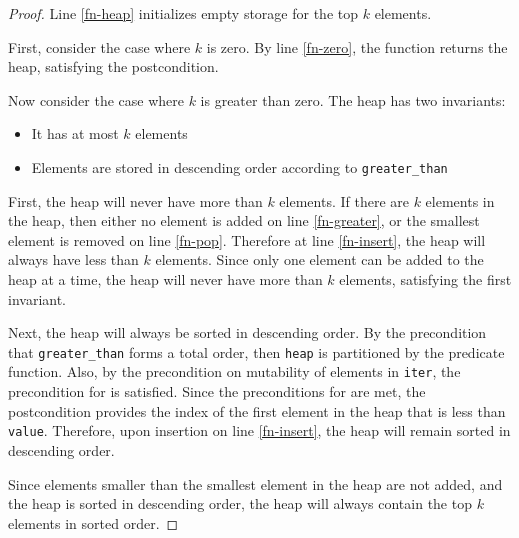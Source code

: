 \documentclass{article}
\begin{document}
\begin{proof}
    Line \ref{fn-heap} initializes empty storage for the top $k$ elements.

    First, consider the case where $k$ is zero.
    By line \ref{fn-zero}, the function returns the heap, satisfying the postcondition.

    Now consider the case where $k$ is greater than zero.
    The heap has two invariants:
    \begin{itemize}
        \item It has at most $k$ elements
        \item Elements are stored in descending order according to \texttt{greater\_than}
    \end{itemize}

    First, the heap will never have more than $k$ elements.
    If there are $k$ elements in the heap, then either no element is added on line \ref{fn-greater},
    or the smallest element is removed on line \ref{fn-pop}.
    Therefore at line \ref{fn-insert}, the heap will always have less than $k$ elements.
    Since only one element can be added to the heap at a time, the heap will never have more than $k$ elements,
    satisfying the first invariant.

    Next, the heap will always be sorted in descending order.
    By the precondition that \texttt{greater\_than} forms a total order,
    then \texttt{heap} is partitioned by the predicate function.
    Also, by the precondition on mutability of elements in \texttt{iter},
    the precondition for  is satisfied.
    Since the preconditions for  are met,
    the postcondition provides the index of the first element in the heap that is less than \texttt{value}.
    Therefore, upon insertion on line \ref{fn-insert}, the heap will remain sorted in descending order.

    Since elements smaller than the smallest element in the heap are not added,
    and the heap is sorted in descending order,
    the heap will always contain the top $k$ elements in sorted order.
\end{proof}
\end{document}
